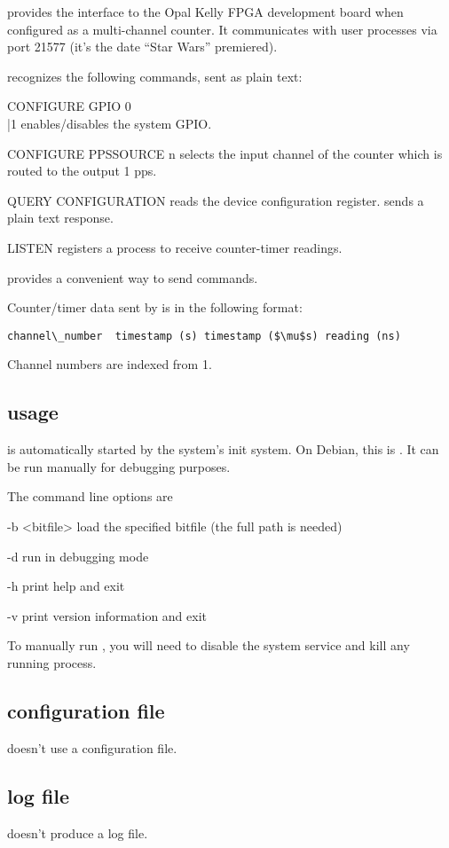  provides the interface to the Opal Kelly FPGA development board when configured as a multi-channel counter.
It communicates with user processes via port 21577 (it's the date ``Star Wars'' premiered).

 recognizes the following commands, sent as plain text:
\begin{description*}
	\item[CONFIGURE GPIO 0\\|1] enables/disables the system GPIO.
	\item[CONFIGURE PPSSOURCE n] selects the input channel of the counter which is
	routed to the output 1 pps. 
	\item[QUERY CONFIGURATION] reads the device configuration register.  sends
	a plain text response.
	\item[LISTEN] registers a process to receive counter-timer readings.
\end{description*}
 provides a convenient way to send commands.

Counter/timer data sent by  is in the following format:
\begin{lstlisting}
channel\_number  timestamp (s) timestamp ($\mu$s) reading (ns)
\end{lstlisting}
Channel numbers are indexed from 1.

\subsection{usage}
 is automatically started by the system's init system. On Debian, this is . 
It can be run manually for debugging purposes.

The command line options are
\begin{description*}
	\item[-b] <bitfile> load the specified bitfile (the full path is needed)
	\item[-d]	run in debugging mode
	\item[-h]	print help and exit
	\item[-v]	print version information and exit
\end{description*}
To manually run , you will need to disable the system service
and kill any running  process.

\subsection{configuration file \label{confformat}}
 doesn't use a configuration file.

\subsection{log file}
 doesn't produce a log file.